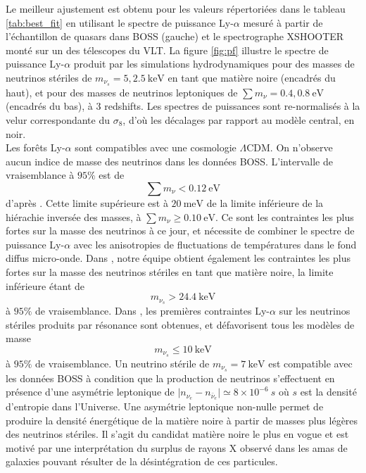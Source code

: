 Le meilleur ajustement est obtenu pour les valeurs répertoriées dans le tableau \ref{tab:best_fit} en utilisant le spectre de puissance Ly-$\alpha$ mesuré à partir de l'échantillon de quasars dans BOSS (gauche) et le spectrographe XSHOOTER monté sur un des télescopes du VLT. La figure \ref{fig:pf} illustre le spectre de puissance Ly-$\alpha$ produit par les simulations hydrodynamiques pour des masses de neutrinos stériles de $m_{\nu_s} = 5, 2.5~\mathrm{keV}$ en tant que matière noire (encadrés du haut), et pour des masses de neutrinos leptoniques de $\sum m_\nu = 0.4, 0.8~\mathrm{eV}$ (encadrés du bas), à 3 redshifts. Les spectres de puissances sont re-normalisés à la velur correspondante du $\sigma_8$, d'où les décalages par rapport au modèle central, en noir.\\

Les forêts Ly-$\alpha$ sont compatibles avec une cosmologie $\Lambda$CDM. On n'observe aucun indice de masse des neutrinos dans les données BOSS. L'intervalle de vraisemblance à $95\%$ est de $$ \sum m_\nu < 0.12~\mathrm{eV} $$ d'après \cite{Palanque2015b, Yeche17}. Cette limite supérieure est à $20~\mathrm{meV}$ de la limite inférieure de la hiérachie inversée des masses, à $\sum m_\nu \geqslant 0.10~ \mathrm{eV}$. Ce sont les contraintes les plus fortes sur la masse des neutrinos à ce jour, et nécessite de combiner le spectre de puissance Ly-$\alpha$ avec les anisotropies de fluctuations de températures dans le fond diffus micro-onde. Dans \cite{Baur16}, notre équipe obtient également les contraintes les plus fortes sur la masse des neutrinos stériles en tant que matière noire, la limite inférieure étant de $$m_{\nu_s} > 24.4~\mathrm{keV}$$ à $95\%$ de vraisemblance. Dans \cite{Baur17}, les premières contraintes Ly-$\alpha$ sur les neutrinos stériles produits par résonance sont obtenues, et défavorisent tous les modèles de masse $$ m_{\nu_s} \leqslant 10~\mathrm{keV} $$ à $95\%$ de vraisemblance. Un neutrino stérile de $m_{\nu_s} = 7~\mathrm{keV}$ est compatible avec les données BOSS à condition que la production de neutrinos s'effectuent en présence d'une asymétrie leptonique de $\vert n_{\nu_e} - n_{\bar{\nu}_e} \vert \simeq 8 \times 10^{-6}~s$ où $s$ est la densité d'entropie dans l'Universe. Une asymétrie leptonique non-nulle permet de produire la densité énergétique de la matière noire à partir de masses plus légères des neutrinos stériles. Il s'agit du candidat matière noire le plus en vogue et est motivé par une interprétation du surplus de rayons X observé dans les amas de galaxies \citep{Bulbul14} pouvant résulter de la désintégration de ces particules. \\


